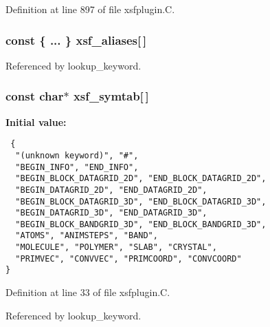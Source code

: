 Definition at line 897 of file xsfplugin.C.
\subsubsection{\setlength{\rightskip}{0pt plus 5cm}const \{ ... \}    xsf\_\-aliases[$\,$]\hspace{0.3cm}{\tt  [static]}}\label{xsfplugin_8C_a4}




Referenced by lookup\_\-keyword.
\subsubsection{\setlength{\rightskip}{0pt plus 5cm}const char$\ast$ xsf\_\-symtab[$\,$]\hspace{0.3cm}{\tt  [static]}}\label{xsfplugin_8C_a1}


{\bf Initial value:}

\footnotesize\begin{verbatim} {
  "(unknown keyword)", "#",
  "BEGIN_INFO", "END_INFO",
  "BEGIN_BLOCK_DATAGRID_2D", "END_BLOCK_DATAGRID_2D",
  "BEGIN_DATAGRID_2D", "END_DATAGRID_2D",
  "BEGIN_BLOCK_DATAGRID_3D", "END_BLOCK_DATAGRID_3D",
  "BEGIN_DATAGRID_3D", "END_DATAGRID_3D",
  "BEGIN_BLOCK_BANDGRID_3D", "END_BLOCK_BANDGRID_3D",
  "ATOMS", "ANIMSTEPS", "BAND",
  "MOLECULE", "POLYMER", "SLAB", "CRYSTAL",
  "PRIMVEC", "CONVVEC", "PRIMCOORD", "CONVCOORD"
}\end{verbatim}\normalsize 


Definition at line 33 of file xsfplugin.C.

Referenced by lookup\_\-keyword.